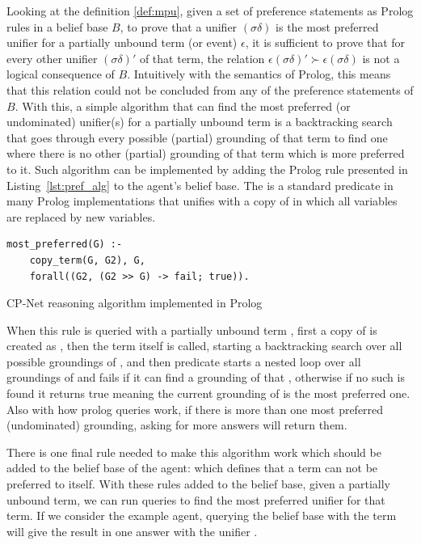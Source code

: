 Looking at the definition \ref{def:mpu}, given a set of preference statements as Prolog rules in a belief base $B$, to prove that a unifier $(\sigma\delta)$ is the most preferred unifier for a partially unbound term (or event) $\epsilon$, it is sufficient to prove that for every other unifier $(\sigma\delta)'$ of that term, the relation $\epsilon(\sigma\delta)' \succ \epsilon(\sigma\delta)$ is not a logical consequence of $B$. Intuitively with the semantics of Prolog, this means that this relation could not be concluded from any of the preference statements of $B$. With this, a simple algorithm that can find the most preferred (or undominated) unifier(s) for a partially unbound term is a backtracking search that goes through every possible (partial) grounding of that term to find one where there is no other (partial) grounding of that term which is more preferred to it. Such algorithm can be implemented by adding the Prolog rule presented in Listing~\ref{lst:pref_alg} to the agent's belief base. The  is a standard predicate in many Prolog implementations that unifies  with a copy of  in which all variables are replaced by new variables. 
\begin{listing}[!ht]
\begin{verbatim}
most_preferred(G) :- 
    copy_term(G, G2), G, 
    forall((G2, (G2 >> G) -> fail; true)).
\end{verbatim}
\caption{CP-Net reasoning algorithm implemented in Prolog}
\label{lst:pref_alg}
\end{listing}

When this rule is queried with a partially unbound term , first a copy of  is created as , then the term  itself is called, starting a backtracking search over all possible groundings of , and then  predicate starts a nested loop over all groundings of  and fails if it can find a grounding of  that , otherwise if no such  is found it returns true meaning the current grounding of  is the most preferred one. Also with how prolog queries work, if there is more than one most preferred (undominated) grounding, asking for more answers will return them.

There is one final rule needed to make this algorithm work which should be added to the belief base of the agent:  which defines that a term can not be preferred to itself. With these rules added to the belief base, given a partially unbound term, we can run queries to find the most preferred unifier for that term. If we consider the example agent, querying the belief base with the term  will give the result in one answer with the unifier . 


